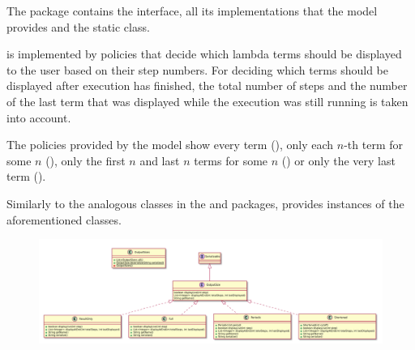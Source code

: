 The \texttt{} package contains the \texttt{} interface, all
its implementations that the model provides and the \texttt{} static
class.

\texttt{} is implemented by policies that decide which lambda terms should be
displayed to the user based on their step numbers. For deciding which terms should
be displayed after execution has finished, the total number of steps and the number of
the last term that was displayed while the execution was still running is taken into
account.

The policies provided by the model show every term (\texttt{}), only each
$n$-th term for some $n$ (\texttt{}), only the first $n$ and last $n$ terms
for some $n$ (\texttt{}) or only the very last term (\texttt{}).

Similarly to the analogous classes in the \texttt{} and \texttt{} packages,
\texttt{} provides instances of the aforementioned classes.

\begin{figure}[H]
	\centering
	\includegraphics[width=\textwidth]{packageDiagrams/modelOutputPackage}
\end{figure}
